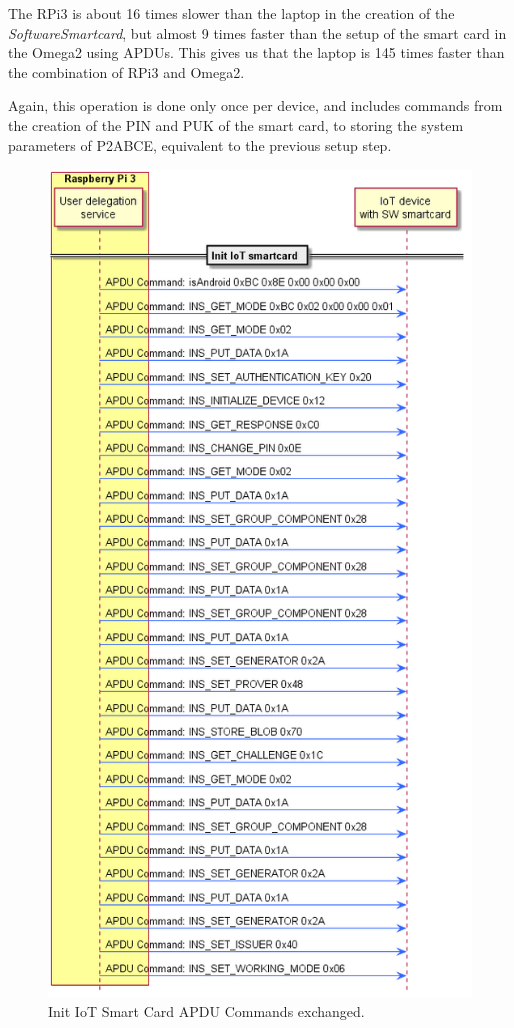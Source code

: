 The RPi3 is about 16 times slower than the laptop in the creation of the \textit{SoftwareSmartcard}, but almost 9 times faster than the setup of the smart card in the Omega2 using APDUs. This gives us that the laptop is 145 times faster than the combination of RPi3 and Omega2.

Again, this operation is done only once per device, and includes commands from the creation of the PIN and PUK of the smart card, to storing the system parameters of P2ABCE, equivalent to the previous setup step.


\begin{figure}[bth]
	\begin{center}
		\includegraphics[width=0.8\linewidth]{gfx/APDUsInitIoTSC}
	\end{center}
	\caption{Init IoT Smart Card APDU Commands exchanged.}
	\label{fig:APDUsInitIoTSC}
\end{figure}

